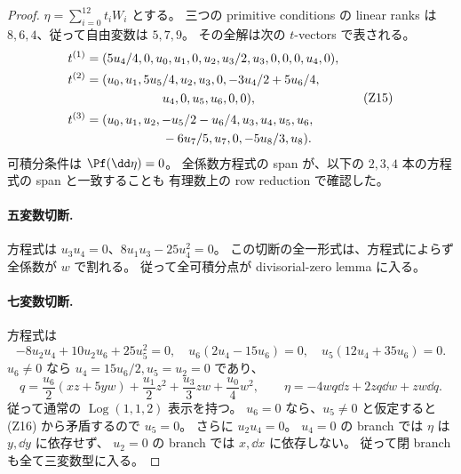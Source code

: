 \begin{proof}
$\eta=\sum_{i=0}^{12}t_iW_i$ とする。
三つの primitive conditions の linear ranks は $8,6,4$、従って自由変数は $5,7,9$。
その全解は次の $t$-vectors で表される。
\[
\begin{aligned}
 t^{(1)}={}&(5u_4/4,0,u_0,u_1,0,u_2,u_3/2,u_3,0,0,0,u_4,0),\\
 t^{(2)}={}&(u_0,u_1,5u_5/4,u_2,u_3,0,-3u_4/2+5u_6/4,\\
           &\hspace{17mm}u_4,0,u_5,u_6,0,0),\\
 t^{(3)}={}&(u_0,u_1,u_2,-u_5/2-u_6/4,u_3,u_4,u_5,u_6,\\
           &\hspace{17mm}-6u_7/5,u_7,0,-5u_8/3,u_8).
\end{aligned}\tag{Z15}
\]
可積分条件は $\Pf(\dd\eta)=0$。
全係数方程式の span が、以下の $2,3,4$ 本の方程式の span と一致することも
有理数上の row reduction で確認した。

\paragraph{五変数切断.}
方程式は $u_3u_4=0$、$8u_1u_3-25u_4^2=0$。
この切断の全一形式は、方程式によらず全係数が $w$ で割れる。
従って全可積分点が divisorial-zero lemma に入る。

\paragraph{七変数切断.}
方程式は
\[
 -8u_2u_4+10u_2u_6+25u_5^2=0,\quad
 u_6(2u_4-15u_6)=0,\quad u_5(12u_4+35u_6)=0.
 \tag{Z16}
\]
$u_6\ne0$ なら $u_4=15u_6/2,u_5=u_2=0$ であり、
\[
 q=\frac{u_6}{2}(xz+5yw)+\frac{u_1}{2}z^2+\frac{u_3}{3}zw+\frac{u_0}{4}w^2,
 \qquad \eta=-4wq\dd z+2zq\dd w+zw\dd q.
\]
従って通常の $\operatorname{Log}(1,1,2)$ 表示を持つ。
$u_6=0$ なら、$u_5\ne0$ と仮定すると (Z16) から矛盾するので $u_5=0$。
さらに $u_2u_4=0$。
$u_4=0$ の branch では $\eta$ は $y,\dd y$ に依存せず、
$u_2=0$ の branch では $x,\dd x$ に依存しない。
従って閉 branch も全て三変数型に入る。


\end{proof}
